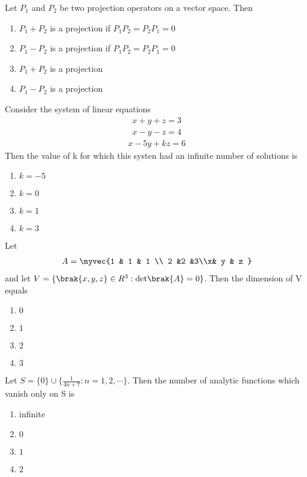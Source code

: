 \item Let $P_1$ and $P_2$ be two projection operators on a vector space. Then 
\begin{enumerate}
    \item $P_1+P_2$ is a projection if $P_1P_2=P_2P_1=0$
    \item $P_1-P_2$ is a projection if $P_1P_2=P_2P_1=0$
    \item $P_1+P_2$ is a projection 
    \item $P_1-P_2$ is a projection 
\end{enumerate}
\item Consider the system of linear equations 
\begin{align*}
    x+y+z=3
\end{align*}
\begin{align*}
    x-y-z=4
\end{align*}
\begin{align*}
    x-5y+kz=6
\end{align*}
Then the value of k for which this systen had an infinite number of solutions is
\begin{multicols}{2}
    \begin{enumerate}
    \item $k=-5$
    \item $k=0$
    \item $k=1$
    \item $k=3$
\end{enumerate}
\end{multicols}
\item Let 
\begin{align*}
    A=\myvec{1 & 1 & 1 \\ 2 &2 &3\\x& y & z }
\end{align*}
and let $V=\{\brak{x,y,z}\in R^3:\text{det}\brak{A}=0\}$. Then the dimension of V equals
\begin{multicols}{2}
\begin{enumerate}
    \item $0$
    \item $1$
    \item $2$
    \item $3$
\end{enumerate}    
\end{multicols}
\item Let $S=\{0\}\cup \{\frac{1}{4n+7}:n=1,2,\cdots\}$. Then the number of analytic functions which vanish only on S is
\begin{multicols}{2}
\begin{enumerate}
    \item infinite
    \item $0$
    \item $1$
    \item $2$
\end{enumerate}    
\end{multicols}
